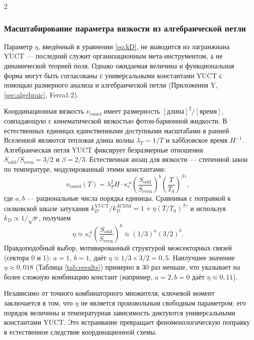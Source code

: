 \documentclass[11pt,a4paper]{article}
\begin{document}
\begin{multicols}{2}
		\subsubsection{Масштабирование параметра вязкости из алгебраической петли}
		\label{subsubsec:viscosity_scaling}
		
		Параметр $\eta$, введённый в уравнении \eqref{eq:kD}, не выводится из лагранжиана YUCT — последний служит организационным мета-инструментом, а не динамической теорией поля. Однако ожидаемая величина и функциональная форма могут быть согласованы с универсальными константами YUCT с помощью размерного анализа и алгебраической петли (Приложения Y, \ref{sec:algebraic}, Ferra1.2).
		
		Координационная вязкость $\nu_{\mathrm{coord}}$ имеет размерность $[\text{длина}]^2/[\text{время}]$, совпадающую с кинематической вязкостью фотон-барионной жидкости. В естественных единицах единственными доступными масштабами в ранней Вселенной являются тепловая длина волны $\lambda_T \sim 1/T$ и хаббловское время $H^{-1}$. Алгебраическая петля YUCT фиксирует безразмерные отношения $S_{\mathrm{odd}}/S_{\mathrm{even}} = 3/2$ и $\beta = 2/3$. Естественная анзац для вязкости — степенной закон по температуре, модулированный этими константами:
		\begin{equation}
			\nu_{\mathrm{coord}}(T) = \lambda_T^2 H \cdot \kappa_c^{\,a} \left(\frac{S_{\mathrm{odd}}}{S_{\mathrm{even}}}\right)^b \left(\frac{T}{T_0}\right)^{\beta\gamma},
		\end{equation}
		где $a,b$ — рациональные числа порядка единицы. Сравнивая с поправкой к силковской шкале затухания $k_D^{\mathrm{YUCT}}/k_D^{\Lambda\mathrm{CDM}} = 1 + \eta (T/T_0)^{\beta\gamma}$ и используя $k_D \propto 1/\sqrt{\nu}$, получаем
		\begin{equation}
			\eta \approx \kappa_c^{\,a} \left(\frac{S_{\mathrm{odd}}}{S_{\mathrm{even}}}\right)^b \approx (1/3)^a (3/2)^b.
		\end{equation}
		Правдоподобный выбор, мотивированный структурой межсекторных связей (сектора 0 и 1): $a=1$, $b=1$, даёт $\eta \approx 1/3 \times 3/2 = 0,5$. Наилучшее значение $\eta \approx 0,018$ (Таблица \ref{tab:results}) примерно в 30 раз меньше, что указывает на более сложную комбинацию констант (например, $a=2, b=0$ даёт $\eta \approx 0,11$).
		
		Независимо от точного комбинаторного множителя, ключевой момент заключается в том, что $\eta$ не является произвольным свободным параметром; его порядок величины и температурная зависимость диктуются универсальными константами YUCT. Это встраивание превращает феноменологическую поправку в естественное следствие координационной схемы.
		

\end{multicols}
\end{document}
